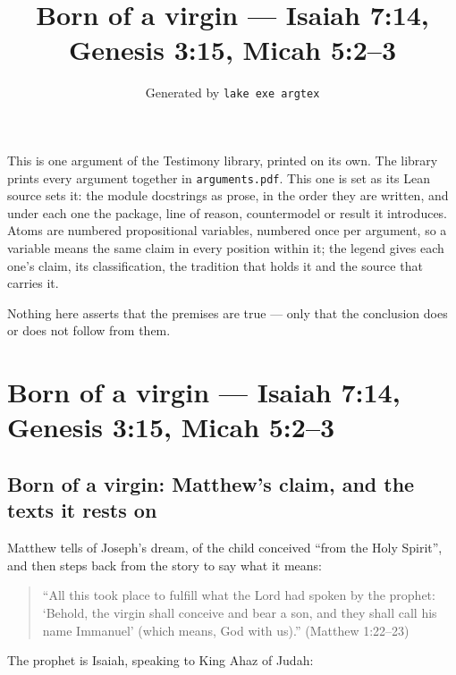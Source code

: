 \documentclass[11pt]{article}
\title{Born of a virgin — Isaiah 7:14, Genesis 3:15, Micah 5:2–3}
\author{\credit{TestimonyArguments.BornOfAVirgin}}
\date{Generated by \texttt{lake exe argtex}}
\begin{document}
\maketitle
\noindent This is one argument of the Testimony library, printed on its own. The library prints every argument together in \texttt{arguments.pdf}. This one is set as its Lean source sets it: the module docstrings as prose, in the order they are written, and under each one the package, line of reason, countermodel or result it introduces. Atoms are numbered propositional variables, numbered once per argument, so a variable means the same claim in every position within it; the legend gives each one's claim, its classification, the tradition that holds it and the source that carries it.

\noindent Nothing here asserts that the premises are true --- only that the conclusion does or does not follow from them.

\tableofcontents
\clearpage
\section*{Born of a virgin — Isaiah 7:14, Genesis 3:15, Micah 5:2–3}

\subsection*{Born of a virgin: Matthew’s claim, and the texts it rests on}
Matthew tells of Joseph’s dream, of the child conceived “from the Holy Spirit”, and then steps back from the story to say what it means:

\begin{quote}
“All this took place to fulfill what the Lord had spoken by the prophet: ‘Behold, the virgin shall conceive and bear a son, and they shall call his name Immanuel’ (which means, God with us).” (Matthew 1:22–23)

\end{quote}
The prophet is Isaiah, speaking to King Ahaz of Judah:
\end{document}
